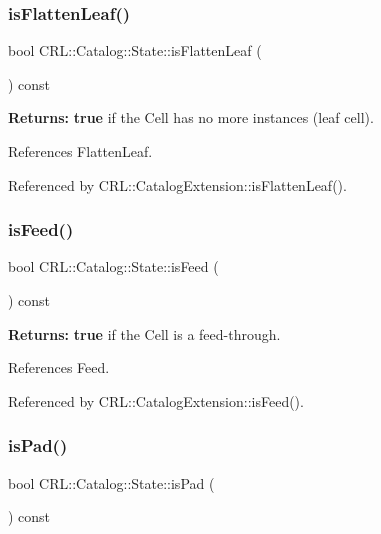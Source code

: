 \subsubsection{\texorpdfstring{is\+Flatten\+Leaf()}{isFlattenLeaf()}}
{\footnotesize\ttfamily bool C\+R\+L\+::\+Catalog\+::\+State\+::is\+Flatten\+Leaf (\begin{DoxyParamCaption}{ }\end{DoxyParamCaption}) const\hspace{0.3cm}{\ttfamily [inline]}}

{\bfseries Returns\+:} {\bfseries true} if the Cell has no more instances (leaf cell). 

References Flatten\+Leaf.



Referenced by C\+R\+L\+::\+Catalog\+Extension\+::is\+Flatten\+Leaf().

\mbox{\label{classCRL_1_1Catalog_1_1State_a53c89121d49a7fc9f8a09093a35d32c4}} 
\subsubsection{\texorpdfstring{is\+Feed()}{isFeed()}}
{\footnotesize\ttfamily bool C\+R\+L\+::\+Catalog\+::\+State\+::is\+Feed (\begin{DoxyParamCaption}{ }\end{DoxyParamCaption}) const\hspace{0.3cm}{\ttfamily [inline]}}

{\bfseries Returns\+:} {\bfseries true} if the Cell is a feed-\/through. 

References Feed.



Referenced by C\+R\+L\+::\+Catalog\+Extension\+::is\+Feed().

\mbox{\label{classCRL_1_1Catalog_1_1State_a457e8dcf1928e6df40ec9f686350c2d0}} 
\subsubsection{\texorpdfstring{is\+Pad()}{isPad()}}
{\footnotesize\ttfamily bool C\+R\+L\+::\+Catalog\+::\+State\+::is\+Pad (\begin{DoxyParamCaption}{ }\end{DoxyParamCaption}) const\hspace{0.3cm}{\ttfamily [inline]}}

